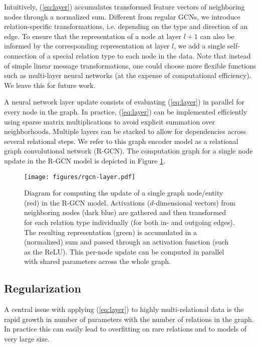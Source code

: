 Intuitively, (\ref{eq:layer}) accumulates transformed feature vectors of neighboring nodes through a normalized sum. Different from regular GCNs, we introduce relation-specific transformations, i.e. depending on the type and direction of an edge.
To ensure that the representation of a node at layer $l+1$ can also be informed by the corresponding representation at layer $l$, we add a single self-connection of a special relation type to each node in the data. Note that instead of simple linear message transformations, one could choose more flexible functions such as multi-layer neural networks (at the expense of computational efficiency). We leave this for future work.

A neural network layer update consists of evaluating (\ref{eq:layer}) in parallel for every node in the graph. In practice, (\ref{eq:layer}) can be implemented efficiently using sparse matrix multiplications to avoid explicit summation over neighborhoods. Multiple layers can be stacked to allow for dependencies across several relational steps. We refer to this graph encoder model as a relational graph convolutional network (R-GCN). The computation graph for a single node update in the R-GCN model is depicted in Figure \ref{fig:model}.

\begin{figure}[t!]
        \centering
    \texttt{[image: figures/rgcn-layer.pdf]}
    \label{fig:model-a}
    \caption{Diagram for computing the update of a single graph node/entity (red) in the R-GCN model. Activations ($d$-dimensional  vectors) from neighboring nodes (dark blue) are gathered and then transformed for each relation type individually (for both in- and outgoing edges). The resulting representation (green) is accumulated in a (normalized) sum and passed through an activation function (such as the ReLU). This per-node update can be computed in parallel with shared parameters across the whole graph.}
    \label{fig:model}
\end{figure}

\subsection{Regularization}
A central issue with applying (\ref{eq:layer}) to highly multi-relational data is the rapid growth in number of parameters with the number of relations in the graph. In practice this can easily lead to overfitting on rare relations and to models of very large size.

